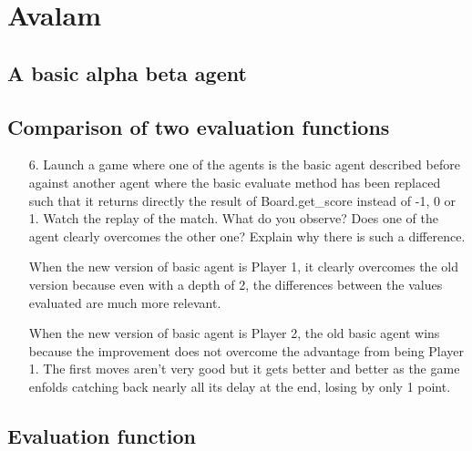 \section{Avalam}
    \subsection{A basic alpha beta agent}
    \subsection{Comparison of two evaluation functions}
    \begin{enumerate}
    \item[6.] Launch a game where one of the agents is the basic agent described before against another agent where the basic evaluate method has been replaced such that it returns directly the result of Board.get\_score instead of -1, 0 or 1. Watch the replay of the match. What do you observe? Does one of the agent clearly overcomes the other one? Explain why there is such a difference.
      \begin{framed}
          When the new version of basic agent is Player 1, it clearly
          overcomes the old version because even with a depth of 2, the
          differences between the values evaluated are  much more relevant.
          \newline

          When the new version of basic agent is Player 2, the old basic
          agent wins because the improvement does not overcome the advantage
          from being Player 1. The first moves aren't very good but it gets
          better and better as the game enfolds catching back nearly all
          its delay at the end, losing by only 1 point. \newline
      \end{framed}
\end{enumerate}

\subsection{Evaluation function}

